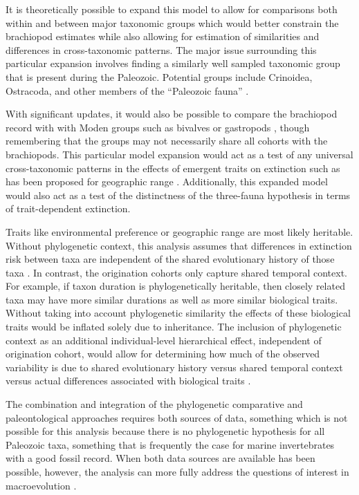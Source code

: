\documentclass[11pt]{article}
\begin{document}
It is theoretically possible to expand this model to allow for comparisons both within and between major taxonomic groups which would better constrain the brachiopod estimates while also allowing for estimation of similarities and differences in cross-taxonomic patterns. The major issue surrounding this particular expansion involves finding a similarly well sampled taxonomic group that is present during the Paleozoic. Potential groups include Crinoidea, Ostracoda, and other members of the ``Paleozoic fauna'' \citep{Sepkoski1981a}.

With significant updates, it would also be possible to compare the brachiopod record with with Moden groups such as bivalves or gastropods \citep{Sepkoski1981a}, though remembering that the groups may not necessarily share all cohorts with the brachiopods. This particular model expansion would act as a test of any universal cross-taxonomic patterns in the effects of emergent traits on extinction such as has been proposed for geographic range \citep{Payne2007}. Additionally, this expanded model would also act as a test of the distinctness of the \citet{Sepkoski1981a} three-fauna hypothesis in terms of trait-dependent extinction.

Traits like environmental preference or geographic range \citep{Jablonski1987,Hunt2005b} are most likely heritable. Without phylogenetic context, this analysis assumes that differences in extinction risk between taxa are independent of the shared evolutionary history of those  taxa \citep{Felsenstein1985b}. In contrast, the origination cohorts only capture shared temporal context. For example, if taxon duration is phylogenetically heritable, then closely related taxa may have more similar durations as well as more similar biological traits. Without taking into account phylogenetic similarity the effects of these biological traits would be inflated solely due to inheritance. The inclusion of phylogenetic context as an additional individual-level hierarchical effect, independent of origination cohort, would allow for determining how much of the observed variability is due to shared evolutionary history versus shared temporal context versus actual differences associated with biological traits \citep{Smits2015}.

The combination and integration of the phylogenetic comparative and paleontological approaches requires both sources of data, something which is not possible for this analysis because there is no phylogenetic hypothesis for all Paleozoic taxa, something that is frequently the case for marine invertebrates with a good fossil record. When both data sources are available has been possible, however, the analysis can more fully address the questions of interest in macroevolution \citep{Smits2015,Slater2013a,Slater2015b,Simpson2011,Tomiya2013,Slater2012,Raia2013c,Raia2012f,Harnik2014,Fritz2013a}.
\end{document}
